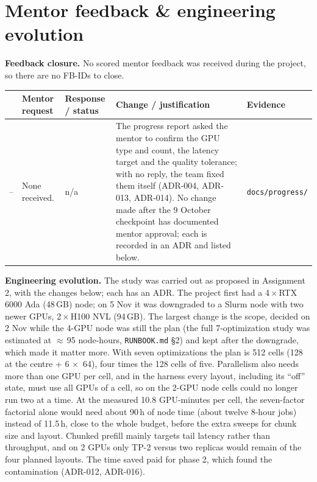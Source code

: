 \documentclass[10pt,a4paper]{article}
\newcommand{\hc}[1]{{\leavevmode\bfseries\color{ink}#1}}   %
\newcommand{\x}{\ensuremath{\times}}
\newcommand{\fp}[1]{{\leavevmode\urlstyle{tt}\color{codecol}\nolinkurl{#1}}}
\begin{document}
\section{Mentor feedback \& engineering evolution}\label{sec:feedback}
\textbf{Feedback closure.} No scored mentor feedback was received during the project, so there are no FB-IDs to close.

{\small
\begin{tabularx}{\linewidth}{@{}P{1.0cm}P{3.6cm}P{2.0cm}LP{2.6cm}@{}}
\toprule
\rowcolor{tblhead}\hc{FB-ID} & \hc{Mentor request} & \hc{Response / status} & \hc{Change / justification} & \hc{Evidence} \\
\midrule
-- & None received. & n/a & The progress report asked the mentor to confirm the GPU type and count, the latency target
and the quality tolerance; with no reply, the team fixed them itself (ADR-004, ADR-013, ADR-014). No change made after
the 9 October checkpoint has documented mentor approval; each is recorded in an ADR and listed below. &
\fp{docs/progress/} \\
\bottomrule
\end{tabularx}}

\medskip
\textbf{Engineering evolution.} The study was carried out as proposed in Assignment 2, with the changes below; each has
an ADR. The project first had
a 4\,\x\,RTX 6000 Ada (48\,GB) node; on 5 Nov it was downgraded to a Slurm node with two newer GPUs,
2\,\x\,H100 NVL (94\,GB). The largest change is the scope, decided on 2 Nov while the 4-GPU node was still the plan
(the full 7-optimization study was estimated at $\approx$\,95 node-hours, \fp{RUNBOOK.md} \S2) and kept after the
downgrade, which made it matter more. With seven optimizations the plan is 512 cells (128 at the centre + 6 \x\ 64), four times the 128 cells of five.
Parallelism also needs more than one GPU per cell, and in the harness every layout, including its ``off'' state, must
use all GPUs of a cell, so on the 2-GPU node cells could no longer run two at a time. At the measured 10.8
GPU-minutes per cell, the seven-factor factorial alone would need about 90\,h of node time (about twelve 8-hour jobs)
instead of 11.5\,h, close to the whole budget, before the extra sweeps for chunk size and layout. Chunked prefill
mainly targets tail latency rather than throughput, and on 2 GPUs only TP-2 versus two replicas would remain of the
four planned layouts. The time saved paid for phase 2, which found the contamination (ADR-012, ADR-016).
\end{document}
